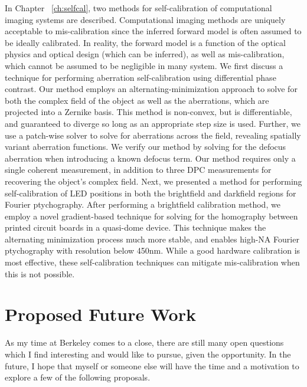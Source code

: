 In Chapter ~\ref{ch:selfcal}, two methods for self-calibration of computational imaging systems are described. Computational imaging methods are uniquely acceptable to mis-calibration since the inferred forward model is often assumed to be ideally calibrated. In reality, the forward model is a function of the optical physics and optical design (which can be inferred), as well as mis-calibration, which cannot be assumed to be negligible in many system. We first discuss a technique for performing aberration self-calibration using differential phase contrast. Our method employs an alternating-minimization approach to solve for both the complex field of the object as well as the aberrations, which are projected into a Zernike basis. This method is non-convex, but is differentiable, and guaranteed to diverge so long as an appropriate step size is used. Further, we use a patch-wise solver to solve for aberrations across the field, revealing spatially variant aberration functions. We verify our method by solving for the defocus aberration when introducing a known defocus term. Our method requires only a single coherent measurement, in addition to three DPC measurements for recovering the object's complex field. Next, we presented a method for performing self-calibration of LED positions in both the brightfield and darkfield regions for Fourier ptychography. After performing a brightfield calibration method, we employ a novel gradient-based technique for solving for the homography between printed circuit boards in a quasi-dome device. This technique makes the alternating minimization process much more stable, and enables high-NA Fourier ptychography with resolution below 450nm. While a good hardware calibration is most effective, these self-calibration techniques can mitigate mis-calibration when this is not possible.

\section{Proposed Future Work}
As my time at Berkeley comes to a close, there are still many open questions which I find interesting and would like to pursue, given the opportunity. In the future, I hope that myself or someone else will have the time and a motivation to explore a few of the following proposals.

